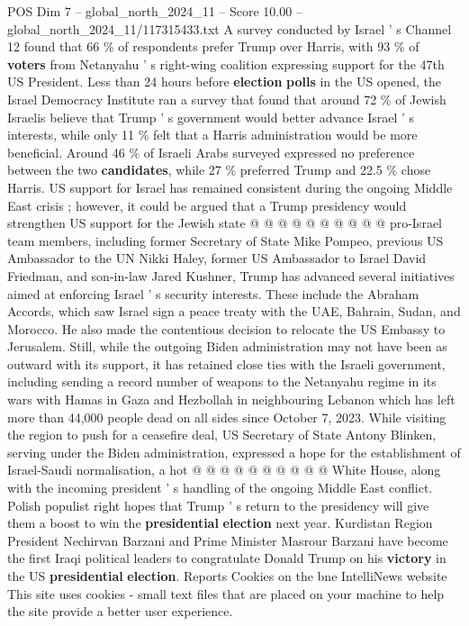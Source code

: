 \begin{textsample}{POS Dim 7 – global\_north\_2024\_11 – Score 10.00 – global\_north\_2024\_11/117315433.txt}
A survey conducted by Israel ' s Channel 12 found that 66 \% of respondents prefer Trump over Harris, with 93 \% of \textbf{voters} from Netanyahu ' s right-wing coalition expressing support for the 47th US President.
Less than 24 hours before \textbf{election} \textbf{polls} in the US opened, the Israel Democracy Institute ran a survey that found that around 72 \% of Jewish Israelis believe that Trump ' s government would better advance Israel ' s interests, while only 11 \% felt that a Harris administration would be more beneficial.
Around 46 \% of Israeli Arabs surveyed expressed no preference between the two \textbf{candidates}, while 27 \% preferred Trump and 22.5 \% chose Harris.
US support for Israel has remained consistent during the ongoing Middle East crisis ; however, it could be argued that a Trump presidency would strengthen US support for the Jewish state @ @ @ @ @ @ @ @ @ @ pro-Israel team members, including former Secretary of State Mike Pompeo, previous US Ambassador to the UN Nikki Haley, former US Ambassador to Israel David Friedman, and son-in-law Jared Kushner, Trump has advanced several initiatives aimed at enforcing Israel ' s security interests.
These include the Abraham Accords, which saw Israel sign a peace treaty with the UAE, Bahrain, Sudan, and Morocco.
He also made the contentious decision to relocate the US Embassy to Jerusalem.
Still, while the outgoing Biden administration may not have been as outward with its support, it has retained close ties with the Israeli government, including sending a record number of weapons to the Netanyahu regime in its wars with Hamas in Gaza and Hezbollah in neighbouring Lebanon which has left more than 44,000 people dead on all sides since October 7, 2023.
While visiting the region to push for a ceasefire deal, US Secretary of State Antony Blinken, serving under the Biden administration, expressed a hope for the establishment of Israel-Saudi normalisation, a hot @ @ @ @ @ @ @ @ @ @ White House, along with the incoming president ' s handling of the ongoing Middle East conflict.
Polish populist right hopes that Trump ' s return to the presidency will give them a boost to win the \textbf{presidential} \textbf{election} next year.
Kurdistan Region President Nechirvan Barzani and Prime Minister Masrour Barzani have become the first Iraqi political leaders to congratulate Donald Trump on his \textbf{victory} in the US \textbf{presidential} \textbf{election}.
Reports Cookies on the bne IntelliNews website This site uses cookies - small text files that are placed on your machine to help the site provide a better user experience.

\end{textsample}
